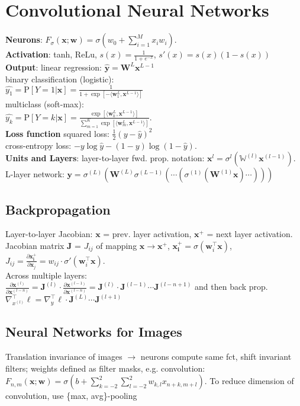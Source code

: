 \section{Convolutional Neural Networks}
\textbf{Neurons}: $F_\sigma(\mathbf{x};\mathbf{w}) = \sigma(w_0 + \sum_{i=1}^M{x_iw_i})$.\\
\textbf{Activation}: tanh, ReLu, $s(x)=\frac{1}{1+e^{-x}}$, $s'(x)=s(x)(1-s(x))$\\
\textbf{Output}: linear regression: $\hat{\mathbf{y}} = \mathbf{W}^L\mathbf{x}^{L-1}$\\
binary classification (logistic):\\
$\hat{y_1} = \text{P}[Y=1|\mathbf{x}] = \frac{1}{1 + \exp[-\langle \mathbf{w}_1^L,\mathbf{x}^{L-1}\rangle]}$\\
multiclass (soft-max):\\
$\hat{y_k} = \text{P}[Y=k|\mathbf{x}]= \frac{\exp[\langle \mathbf{w}_k^L,\mathbf{x}^{L-1}\rangle]}{\sum_{m=1}^{K}{\exp[\langle \mathbf{w}_m^L, \mathbf{x}^{L-1}\rangle]}}$.\\
\textbf{Loss function} squared loss: $\frac{1}{2}(y - \hat{y})^2$\\
cross-entropy loss: $-y \log \hat{y} - (1-y)\log(1-\hat{y})$.\\
\textbf{Units and Layers}: layer-to-layer fwd. prop. notation: $\mathbf{x}^{l} = \sigma^{l}\left(\mathbb{W}^{\left(l\right)}\mathbf{x}^{\left(l-1\right)}\right)$. L-layer network: $\mathbf{y}=\sigma^{\left(L\right)}\left(\mathbf{W}^(L)\sigma^{(L-1)}\left(\cdots\left(\sigma^{(1)}\left(\mathbf{W}^{(1)}\mathbf{x}\right)\cdots\right)\right)\right)$

\subsection*{Backpropagation}
Layer-to-layer Jacobian: $\mathbf{x}$ = prev. layer activation, $\mathbf{x^+}$ = next layer activation. Jacobian matrix $\mathbf{J}$ = $J_{ij}$ of mapping $\mathbf{x}\rightarrow\mathbf{x^+}$, $\mathbf{x_i^+} = \sigma(\mathbf{w}_i^\top\mathbf{x})$, $J_{ij} = \frac{\partial \mathbf{x_i^+}}{\partial \mathbf{x}_j} = w_{ij}\cdot\sigma'(\mathbf{w}_i^\top\mathbf{x})$.\\
Across multiple layers:\\
$\frac{\partial\mathbf{x}^{(l)}}{\partial\mathbf{x}^{(l-n)}} = \mathbf{J}^{(l)}\cdot\frac{\partial\mathbf{x}^{(l-1)}}{\partial\mathbf{x}^{(l-n)}}=\mathbf{J}^{(l)}\cdot\mathbf{J}^{(l-1)}\cdots\mathbf{J}^{(l-n+1)}$ and then back prop. $ \nabla_{x^{(l)}}^\top\ell=\nabla_{y}^\top\ell\cdot\mathbf{J}^{(L)}\cdots\mathbf{J}^{(l+1)}$

\subsection*{Neural Networks for Images}
Translation invariance of images $\rightarrow$ neurons compute same fct, shift invariant filters; weights defined as filter masks, e.g. convolution: $F_{n,m}(\mathbf{x};\mathbf{w}) = \sigma(b + \sum_{k=-2}^2\sum_{l=-2}^{2}{w_{k,l}x_{n+k,m+l}})$. To reduce dimension of convolution, use \{max, avg\}-pooling
